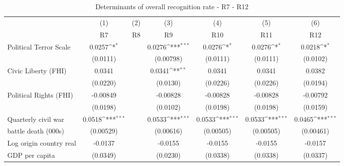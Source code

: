 \begin{table}[!ht]\centering \scriptsize
	\def\sym#1{\ifmmode^{#1}\else\(^{#1}\)\fi}
	\caption{Determinants of overall recognition rate - R7 - R12}
	\begin{tabular}{l*{6}{c}}
		\hline\hline
		&\multicolumn{1}{c}{(1)}     &\multicolumn{1}{c}{(2)}       &\multicolumn{1}{c}{(3)}       &\multicolumn{1}{c}{(4)}    	&\multicolumn{1}{c}{(5)}  	&\multicolumn{1}{c}{(6)}   \\
		&\multicolumn{1}{c}{R7}&\multicolumn{1}{c}{R8}&\multicolumn{1}{c}{R9}&\multicolumn{1}{c}{R10}&\multicolumn{1}{c}{R11}&\multicolumn{1}{c}{R12}\\ 
\hline
Political Terror Scale&      0.0257\sym{*}  &                     &      0.0276\sym{***}&      0.0276\sym{*}  &      0.0276\sym{*}  &      0.0218\sym{*}  \\
                    &    (0.0111)         &                     &   (0.00798)         &    (0.0111)         &    (0.0111)         &    (0.0102)         \\
[0,5em]
Civic Liberty (FHI) &      0.0341         &                     &      0.0341\sym{**} &      0.0341         &      0.0341         &      0.0382         \\
                    &    (0.0220)         &                     &    (0.0130)         &    (0.0226)         &    (0.0226)         &    (0.0194)         \\
[0,5em]
Political Rights (FHI)&    -0.00849         &                     &    -0.00828         &    -0.00828         &    -0.00828         &    -0.00792         \\
                    &    (0.0198)         &                     &    (0.0102)         &    (0.0198)         &    (0.0198)         &    (0.0159)         \\
[0,5em]
Quarterly civil war &      0.0518\sym{***}&                     &      0.0533\sym{***}&      0.0533\sym{***}&      0.0533\sym{***}&      0.0465\sym{***}\\
battle death (000s)                    &   (0.00529)         &                     &   (0.00616)         &   (0.00505)         &   (0.00505)         &   (0.00461)         \\
[0,5em]
Log origin country real &     -0.0137         &                     &     -0.0155         &     -0.0155         &     -0.0155         &     -0.0157         \\
GDP per capita                    &    (0.0349)         &                     &    (0.0230)         &    (0.0338)         &    (0.0338)         &    (0.0337)         \\

\end{tabular}
\end{table}

